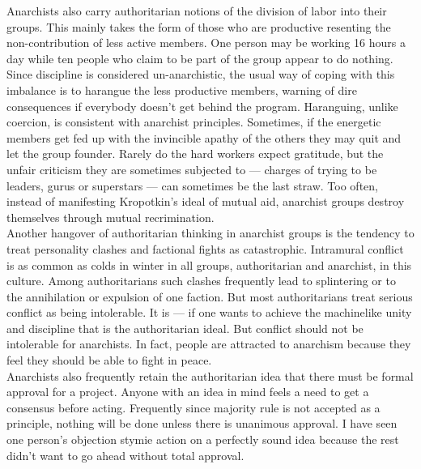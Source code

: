 Anarchists also carry authoritarian notions of the division of labor into their groups. This mainly takes the form of those who are productive resenting the non-contribution of less active members. One person may be working 16 hours a day while ten people who claim to be part of the group appear to do nothing. Since discipline is considered un-anarchistic, the usual way of coping with this imbalance is to harangue the less productive members, warning of dire consequences if everybody doesn't get behind the program. Haranguing, unlike coercion, is consistent with anarchist principles. Sometimes, if the energetic members get fed up with the invincible apathy of the others they may quit and let the group founder. Rarely do the hard workers expect gratitude, but the unfair criticism they are sometimes subjected to --- charges of trying to be leaders, gurus or superstars --- can sometimes be the last straw. Too often, instead of manifesting Kropotkin's ideal of mutual aid, anarchist groups destroy themselves through mutual recrimination.\\
Another hangover of authoritarian thinking in anarchist groups is the tendency to treat personality clashes and factional fights as catastrophic. Intramural conflict is as common as colds in winter in all groups, authoritarian and anarchist, in this culture. Among authoritarians such clashes frequently lead to splintering or to the annihilation or expulsion of one faction. But most authoritarians treat serious conflict as being intolerable. It is --- if one wants to achieve the machinelike unity and discipline that is the authoritarian ideal. But conflict should not be intolerable for anarchists. In fact, people are attracted to anarchism because they feel they should be able to fight in peace.\\
Anarchists also frequently retain the authoritarian idea that there must be formal approval for a project. Anyone with an idea in mind feels a need to get a consensus before acting. Frequently since majority rule is not accepted as a principle, nothing will be done unless there is unanimous approval. I have seen one person's objection stymie action on a perfectly sound idea because the rest didn't want to go ahead without total approval.\\
